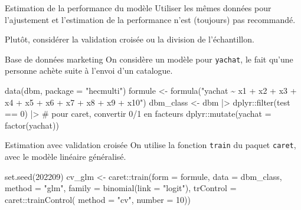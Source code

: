 \documentclass[
  ignorenonframetext,
]{beamer}
\newenvironment{Shaded}{\begin{snugshade}}{\end{snugshade}}
\newcommand{\AttributeTok}[1]{\textcolor[rgb]{0.40,0.45,0.13}{#1}}
\newcommand{\CommentTok}[1]{\textcolor[rgb]{0.37,0.37,0.37}{#1}}
\newcommand{\DecValTok}[1]{\textcolor[rgb]{0.68,0.00,0.00}{#1}}
\newcommand{\FunctionTok}[1]{\textcolor[rgb]{0.28,0.35,0.67}{#1}}
\newcommand{\NormalTok}[1]{\textcolor[rgb]{0.00,0.23,0.31}{#1}}
\newcommand{\OtherTok}[1]{\textcolor[rgb]{0.00,0.23,0.31}{#1}}
\newcommand{\SpecialCharTok}[1]{\textcolor[rgb]{0.37,0.37,0.37}{#1}}
\newcommand{\StringTok}[1]{\textcolor[rgb]{0.13,0.47,0.30}{#1}}
\begin{document}
\begin{frame}{Estimation de la performance du modèle}
\protect\hypertarget{estimation-de-la-performance-du-moduxe8le}{}
Utiliser les mêmes données pour l'ajustement et l'estimation de la
performance n'est (toujours) pas recommandé.

Plutôt, considérer la validation croisée ou la division de
l'échantillon.
\end{frame}

\begin{frame}[fragile]{Base de données marketing}
\protect\hypertarget{base-de-donnuxe9es-marketing}{}
On considère un modèle pour \texttt{yachat}, le fait qu'une personne
achète suite à l'envoi d'un catalogue.

\begin{Shaded}
\begin{Highlighting}[numbers=left,,]
\FunctionTok{data}\NormalTok{(dbm, }\AttributeTok{package =} \StringTok{"hecmulti"}\NormalTok{)}
\NormalTok{formule }\OtherTok{\textless{}{-}} \FunctionTok{formula}\NormalTok{(}\StringTok{"yachat \textasciitilde{} x1 + x2 + x3 +}
\StringTok{                x4 + x5 + x6 + x7 + x8 + x9 + x10"}\NormalTok{)}
\NormalTok{dbm\_class }\OtherTok{\textless{}{-}}\NormalTok{ dbm }\SpecialCharTok{|\textgreater{}}
\NormalTok{  dplyr}\SpecialCharTok{::}\FunctionTok{filter}\NormalTok{(test }\SpecialCharTok{==} \DecValTok{0}\NormalTok{) }\SpecialCharTok{|\textgreater{}}
  \CommentTok{\# pour caret, convertir 0/1 en facteurs}
\NormalTok{  dplyr}\SpecialCharTok{::}\FunctionTok{mutate}\NormalTok{(}\AttributeTok{yachat =} \FunctionTok{factor}\NormalTok{(yachat))}
\end{Highlighting}
\end{Shaded}
\end{frame}

\begin{frame}[fragile]{Estimation avec validation croisée}
\protect\hypertarget{estimation-avec-validation-croisuxe9e}{}
On utilise la fonction \texttt{train} du paquet \texttt{caret}, avec le
modèle linéaire généralisé.

\begin{Shaded}
\begin{Highlighting}[numbers=left,,]
\FunctionTok{set.seed}\NormalTok{(}\DecValTok{202209}\NormalTok{)}
\NormalTok{cv\_glm }\OtherTok{\textless{}{-}} 
\NormalTok{  caret}\SpecialCharTok{::}\FunctionTok{train}\NormalTok{(}\AttributeTok{form =}\NormalTok{ formule,}
             \AttributeTok{data =}\NormalTok{ dbm\_class,}
             \AttributeTok{method =} \StringTok{"glm"}\NormalTok{,}
             \AttributeTok{family =} \FunctionTok{binomial}\NormalTok{(}\AttributeTok{link =} \StringTok{"logit"}\NormalTok{),}
             \AttributeTok{trControl =}\NormalTok{ caret}\SpecialCharTok{::}\FunctionTok{trainControl}\NormalTok{(}
               \AttributeTok{method =} \StringTok{"cv"}\NormalTok{,}
               \AttributeTok{number =} \DecValTok{10}\NormalTok{))}
\end{Highlighting}
\end{Shaded}
\end{frame}
\end{document}

